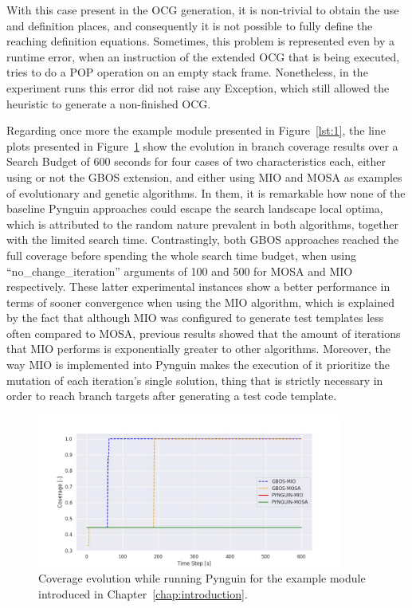 \documentclass[%
  chapterprefix=false,%
  open=right,%
  twoside=true,%
  paper=a4,%
  logofile={Figures/logo.png},%
  thesistype=master,%
  UKenglish,%
]{se2thesis}
\begin{document}
With this case present in the OCG generation, it is non-trivial to obtain the use and definition places, and consequently it is not possible to fully define the reaching definition equations.
Sometimes, this problem is represented even by a runtime error, when an instruction of the extended OCG that is being executed, tries to do a POP operation on an empty stack frame.  
Nonetheless, in the experiment runs this error did not raise any Exception, which still allowed the heuristic to generate a non-finished OCG.\@ 

Regarding once more the example module presented in Figure~\ref{lst:1}, the line plots presented in Figure~\ref{fig:example_cov} show the evolution in branch coverage results over a Search Budget of 600 seconds for four cases of two characteristics each, either using or not the GBOS extension, and either using MIO and MOSA as examples of evolutionary and genetic algorithms.
In them, it is remarkable how none of the baseline Pynguin approaches could escape the search landscape local optima, which is attributed to the random nature prevalent in both algorithms, together with the limited search time.
Contrastingly, both GBOS approaches reached the full coverage before spending the whole search time budget, when using ``no\_change\_iteration'' arguments of 100 and 500 for MOSA and MIO respectively.
These latter experimental instances show a better performance in terms of sooner convergence when using the MIO algorithm, which is explained by the fact that although MIO was configured to generate test templates less often compared to MOSA, previous results showed that the amount of iterations that MIO performs is exponentially greater to other algorithms.
Moreover, the way MIO is implemented into Pynguin makes the execution of it prioritize the mutation of each iteration's single solution, thing that is strictly necessary in order to reach branch targets after generating a test code template. 

\begin{figure}[htb]
  \centering
  \includegraphics[width=0.9\textwidth]{Figures/Results/exampleCov.jpg}
  \caption{Coverage evolution while running Pynguin for the example module introduced in Chapter~\ref{chap:introduction}.}\label{fig:example_cov}
\end{figure}
\end{document}
